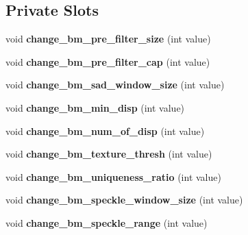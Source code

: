 \subsection*{Private Slots}
\begin{DoxyCompactItemize}
\item 
\hypertarget{classstereo__vision_aa0319c83d83972c5e2946471248e75c7}{}void {\bfseries change\+\_\+bm\+\_\+pre\+\_\+filter\+\_\+size} (int value)\label{classstereo__vision_aa0319c83d83972c5e2946471248e75c7}

\item 
\hypertarget{classstereo__vision_a88c796355054746b0c710f854a131a76}{}void {\bfseries change\+\_\+bm\+\_\+pre\+\_\+filter\+\_\+cap} (int value)\label{classstereo__vision_a88c796355054746b0c710f854a131a76}

\item 
\hypertarget{classstereo__vision_a8121a10f1e88f8927e95216b4cac24f5}{}void {\bfseries change\+\_\+bm\+\_\+sad\+\_\+window\+\_\+size} (int value)\label{classstereo__vision_a8121a10f1e88f8927e95216b4cac24f5}

\item 
\hypertarget{classstereo__vision_a67bc5743196841e228c689dbb24836fc}{}void {\bfseries change\+\_\+bm\+\_\+min\+\_\+disp} (int value)\label{classstereo__vision_a67bc5743196841e228c689dbb24836fc}

\item 
\hypertarget{classstereo__vision_a383e31f5004624e7b733614d795560a8}{}void {\bfseries change\+\_\+bm\+\_\+num\+\_\+of\+\_\+disp} (int value)\label{classstereo__vision_a383e31f5004624e7b733614d795560a8}

\item 
\hypertarget{classstereo__vision_aa46cd94d569e6b081232df19b218e48f}{}void {\bfseries change\+\_\+bm\+\_\+texture\+\_\+thresh} (int value)\label{classstereo__vision_aa46cd94d569e6b081232df19b218e48f}

\item 
\hypertarget{classstereo__vision_ab8d73fb75b7b288c893a5d67fa88723c}{}void {\bfseries change\+\_\+bm\+\_\+uniqueness\+\_\+ratio} (int value)\label{classstereo__vision_ab8d73fb75b7b288c893a5d67fa88723c}

\item 
\hypertarget{classstereo__vision_a26a1e11b0500bb2aff38c8fe38d0bbcb}{}void {\bfseries change\+\_\+bm\+\_\+speckle\+\_\+window\+\_\+size} (int value)\label{classstereo__vision_a26a1e11b0500bb2aff38c8fe38d0bbcb}

\item 
\hypertarget{classstereo__vision_ad6fc54a9e01b8890f55a9f74a2fca828}{}void {\bfseries change\+\_\+bm\+\_\+speckle\+\_\+range} (int value)\label{classstereo__vision_ad6fc54a9e01b8890f55a9f74a2fca828}


\end{DoxyCompactItemize}
